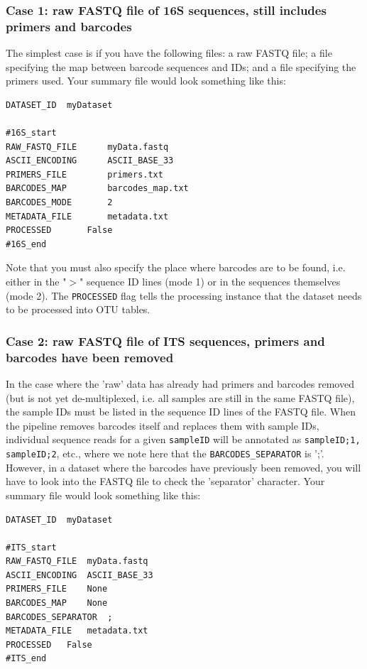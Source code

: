 \documentclass[11pt, oneside]{article}   	%
\begin{document}
\subsubsection{Case 1: raw FASTQ file of 16S sequences, still includes primers and barcodes}
The simplest case is if you have the following files: a raw FASTQ file; a file specifying the map between barcode sequences and IDs; and a file specifying the primers used.  Your summary file would look something like this:

\begin{verbatim}
DATASET_ID	myDataset

#16S_start
RAW_FASTQ_FILE		myData.fastq
ASCII_ENCODING		ASCII_BASE_33
PRIMERS_FILE		primers.txt
BARCODES_MAP		barcodes_map.txt
BARCODES_MODE		2
METADATA_FILE		metadata.txt
PROCESSED		False
#16S_end
\end{verbatim}
Note that you must also specify the place where barcodes are to be found, i.e. either in the "$>$" sequence ID lines (mode 1) or in the sequences themselves (mode 2).  The {\tt PROCESSED} flag tells the processing instance that the dataset needs to be processed into OTU tables.

\subsubsection{Case 2: raw FASTQ file of ITS sequences, primers and barcodes have been removed}
In the case where the 'raw' data has already had primers and barcodes removed (but is not yet de-multiplexed, i.e. all samples are still in the same FASTQ file), the sample IDs must be listed in the sequence ID lines of the FASTQ file.  When the pipeline removes barcodes itself and replaces them with sample IDs, individual sequence reads for a given {\tt sampleID} will be annotated as {\tt sampleID;1, sampleID;2}, etc., where we note here that the {\tt BARCODES\_SEPARATOR} is ';'.  However, in a dataset where the barcodes have previously been removed, you will have to look into the FASTQ file to check the 'separator' character.  Your summary file would look something like this:

\begin{verbatim}
DATASET_ID	myDataset

#ITS_start
RAW_FASTQ_FILE	myData.fastq
ASCII_ENCODING	ASCII_BASE_33
PRIMERS_FILE	None
BARCODES_MAP	None
BARCODES_SEPARATOR	;
METADATA_FILE	metadata.txt
PROCESSED	False
#ITS_end
\end{verbatim}
		
\end{document}
